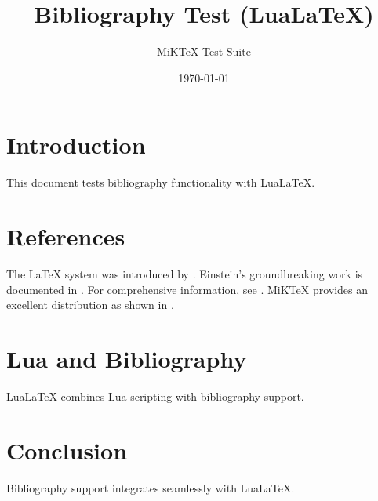 \documentclass{article}
\title{Bibliography Test (LuaLaTeX)}
\author{MiKTeX Test Suite}
\date{\today}
\begin{document}
\maketitle

\section{Introduction}
This document tests bibliography functionality with LuaLaTeX.

\section{References}
The \LaTeX{} system was introduced by \cite{lamport1994}. 
Einstein's groundbreaking work is documented in \cite{einstein1905}.
For comprehensive information, see \cite{goossens1994}.
MiKTeX provides an excellent distribution as shown in \cite{miktex2023}.

\section{Lua and Bibliography}
LuaLaTeX combines Lua scripting with bibliography support.

\section{Conclusion}
Bibliography support integrates seamlessly with LuaLaTeX.



\end{document}
